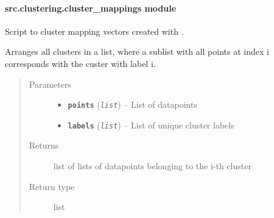 \documentclass[letterpaper,10pt,english]{sphinxmanual}
\begin{document}
\paragraph{src.clustering.cluster\_mappings module}
\label{src.clustering:module-src.clustering.cluster_mappings}\label{src.clustering:src-clustering-cluster-mappings-module}
Script to cluster mapping vectors created with {\hyperref[src.mapping:module\string-src.mapping.mapthreading]{}}.

\begin{fulllineitems}
\label{src.clustering:src.clustering.cluster_mappings.aggregate_cluster}
Arranges all clusters in a list, where a sublist with all points at index i corresponds with the
custer with label i.
\begin{quote}\begin{description}
\item[{Parameters}] \leavevmode\begin{itemize}
\item {} 
\textbf{\texttt{points}} (\emph{\texttt{list}}) -- List of datapoints

\item {} 
\textbf{\texttt{labels}} (\emph{\texttt{list}}) -- List of unique cluster labels

\end{itemize}

\item[{Returns}] \leavevmode
list of lists of datapoints belonging to the i-th cluster

\item[{Return type}] \leavevmode
list

\end{description}\end{quote}

\end{fulllineitems}

\end{document}
